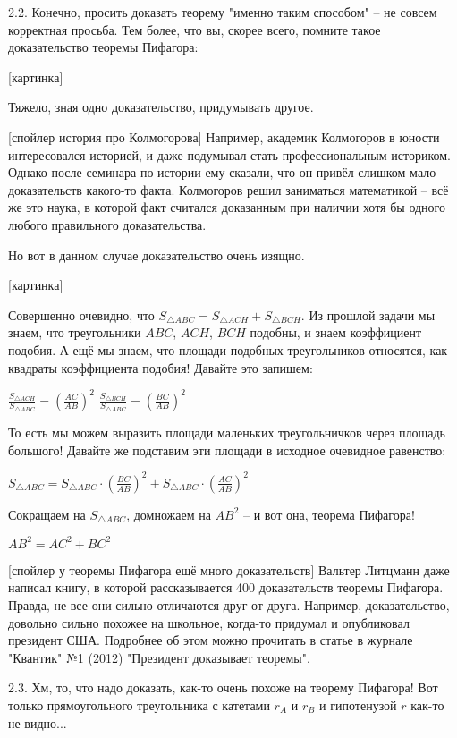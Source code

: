 2.2. Конечно, просить доказать теорему "именно таким способом" -- не совсем корректная просьба. 
Тем более, что вы, скорее всего, помните такое доказательство теоремы Пифагора:

[картинка]

Тяжело, зная одно доказательство, придумывать другое.

[спойлер история про Колмогорова] 
Например, академик Колмогоров в юности интересовался историей, и даже подумывал стать профессиональным историком.
Однако после семинара по истории ему сказали, что он привёл слишком мало доказательств какого-то факта. Колмогоров 
решил заниматься математикой -- всё же это наука, в которой факт считался доказанным при наличии хотя бы одного любого
правильного доказательства.

Но вот в данном случае доказательство очень изящно.

[картинка]

Совершенно очевидно, что $S_{\triangle ABC} = S_{\triangle ACH} + S_{\triangle BCH}$. 
Из прошлой задачи мы знаем, что треугольники $ABC$, $ACH$, $BCH$ подобны, и знаем коэффициент подобия.
А ещё мы знаем, что площади подобных треугольников относятся, как квадраты коэффициента подобия!
Давайте это запишем:

$\frac{S_{\triangle ACH}}{S_{\triangle ABC}} = \left(\frac{AC}{AB}\right)^2$
$\frac{S_{\triangle BCH}}{S_{\triangle ABC}} = \left(\frac{BC}{AB}\right)^2$

То есть мы можем выразить площади маленьких треугольничков через площадь большого! 
Давайте же подставим эти площади в исходное очевидное равенство:

$S_{\triangle ABC} = S_{\triangle ABC} \cdot \left(\frac{BC}{AB}\right)^2 + S_{\triangle ABC} \cdot \left(\frac{AC}{AB}\right)^2$

Сокращаем на $S_{\triangle ABC}$, домножаем на $AB^2$ -- и вот она, теорема Пифагора!

$AB^2 = AC^2 + BC^2$


[спойлер у теоремы Пифагора ещё много доказательств] 
Вальтер Литцманн даже написал книгу, в которой рассказывается 400 доказательств теоремы Пифагора. 
Правда, не все они сильно отличаются друг от друга.
Например, доказательство, довольно сильно похожее на школьное, когда-то придумал и опубликовал президент США.
Подробнее об этом можно прочитать в статье в журнале "Квантик" №1 (2012) "Президент доказывает теоремы".

2.3. Хм, то, что надо доказать, как-то очень похоже на теорему Пифагора! Вот только прямоугольного треугольника с катетами $r_A$ и $r_B$ и гипотенузой $r$ как-то не видно...

